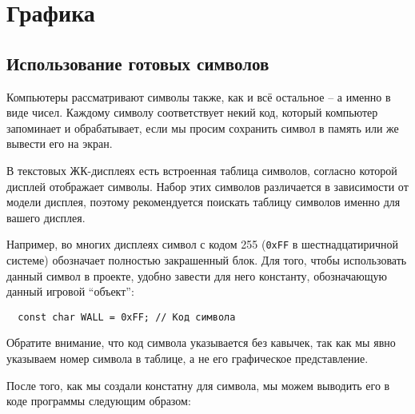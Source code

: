 \documentclass[../sparc.tex]{subfiles}
\begin{document}
\section{Графика}

\subsection{Использование готовых символов}

Компьютеры рассматривают символы также, как и всё остальное -- а именно в виде
чисел.  Каждому символу соответствует некий код, который компьютер запоминает и
обрабатывает, если мы просим сохранить символ в память или же вывести его на
экран.


В текстовых ЖК-дисплеях есть встроенная таблица символов, согласно которой
дисплей отображает символы.  Набор этих символов различается в зависимости от
модели дисплея, поэтому рекомендуется поискать таблицу символов именно для
вашего дисплея.

Например, во многих дисплеях символ с кодом 255 (\texttt{0xFF} в
шестнадцатиричной системе) обозначает полностью закрашенный блок.  Для того,
чтобы использовать данный символ в проекте, удобно завести для него константу,
обозначающую данный игровой ``объект'':

\begin{verbatim}
  const char WALL = 0xFF; // Код символа
\end{verbatim}

Обратите внимание, что код символа указывается без кавычек, так как мы явно
указываем номер символа в таблице, а не его графическое представление.

После того, как мы создали констатну для символа, мы можем выводить его в коде
программы следующим образом:
\end{document}
